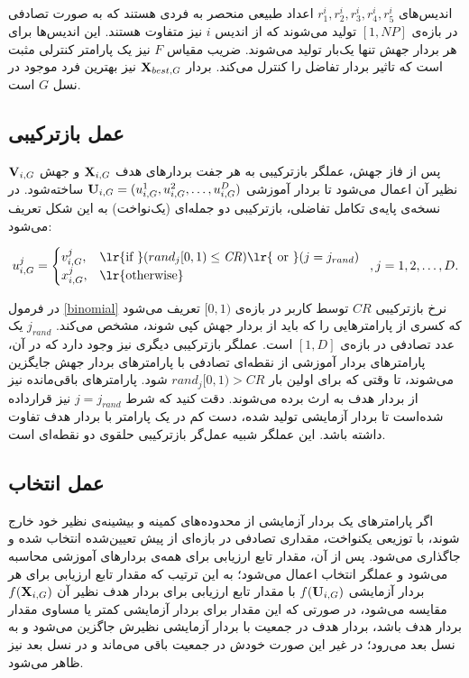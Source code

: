 \documentclass[12pt,a4paper]{article}
\theoremstyle{definition}
\theoremstyle{theorem}
\theoremstyle{definition}
\begin{document}
اندیس‌های 
\( r_{1}^i , r_{2}^i , r_{3}^i , r_{4}^i , r_{5}^i \)
 اعداد طبیعی منحصر به فردی هستند که به صورت تصادفی در بازه‌ی 
 \( [1,\mathit{NP}] \)
 تولید می‌شوند که از اندیس 
 $\mathit{i}$
 نیز متفاوت هستند. این اندیس‌ها برای هر بردار جهش تنها یک‌بار تولید می‌شوند. ضریب مقیاس 
 $\mathit{F}$
 نیز یک پارامتر کنترلی مثبت است که تاثیر بردار تفاضل را کنترل می‌کند. بردار 
 \( {\bf{X}}_{best, G} \)
 نیز بهترین فرد موجود در نسل
  \( G \) 
  است.   
  
\subsection{عمل بازترکیبی}

پس از فاز جهش، عملگر بازترکیبی به هر جفت بردار‌های هدف 
\( {\bf{X}}_{i,G} \)
و جهش 
\( {\bf{V}}_{i,G} \)
نظیر آن اعمال می‌شود تا بردار آموزشی 
\( {\bf{U}}_{i,G} = (u_{i,G}^1, u_{i,G}^2, \dots , u_{i,G}^D ) \)
ساخته‌شود. در نسخه‌ی پایه‌ی تکامل تفاضلی، بازترکیبی دو جمله‌ای (یک‌نواخت) به این شکل تعریف می‌شود:

\begin{equation}
\label{binomial}
u_{i,G}^j =
  \begin{cases}
   v_{i,G}^j , & \text{\lr{if }} (rand_j[0,1) \le \mathit{CR} ) \text{\lr{ or }} (j=j_{rand}) \\
   x_{i,G}^j , & \text{\lr{otherwise}}
  \end{cases}
  \hspace{0.2cm} , j = 1,2, \dots , D.
\end{equation}

در فرمول 
\ref{binomial}
نرخ بازترکیبی 
\( \mathit{CR} \) 
توسط کاربر در بازه‌ی 
$ [ 0 ,1 ) $ 
تعریف می‌شود که کسری از پارامترهایی را که باید از بردار جهش کپی شوند، مشخص می‌کند. 
$ j_{rand} $ 
یک عدد تصادفی در بازه‌ی 
$[ 1 , D ] $
است. عملگر بازترکیبی دیگری نیز وجود دارد که در آن، پارامترهای بردار آموزشی از نقطه‌ای تصادفی با پارامترهای بردار جهش جایگزین می‌شوند،‌ تا وقتی که برای اولین بار 
$rand_j [0,1) > \mathit{CR}$
شود. پارامترهای باقی‌مانده نیز از بردار هدف به ارث برده می‌شوند. دقت کنید که شرط 
$j=j_{rand}$ 
نیز قرارداده شده‌است تا بردار آزمایشی تولید شده، دست کم در یک پارامتر با بردار هدف تفاوت داشته باشد. این عملگر شبیه عمل‌گر بازترکیبی حلقوی دو نقطه‌ای است. 

\subsection{عمل انتخاب} 
اگر پارامتر‌های یک بردار آزمایشی از محدوده‌های کمینه و بیشینه‌ی نظیر خود خارج شوند،‌ با توزیعی یکنواخت، مقداری تصادفی در بازه‌ای از پیش‌ تعیین‌شده انتخاب شده و جاگذاری می‌شود. پس از آن، مقدار تابع ارزیابی برای همه‌ی بردارهای آموزشی محاسبه می‌شود و عملگر انتخاب اعمال می‌شود؛ به این ترتیب که مقدار تابع ارزیابی برای هر بردار آزمایشی 
$f({\bf{U}}_{i,G})$
با مقدار تابع ارزیابی برای بردار هدف نظیر آن 
$f({\bf{X}}_{i,G})$
مقایسه می‌شود، در صورتی که این مقدار برای بردار آزمایشی کمتر یا مساوی مقدار بردار هدف باشد، بردار هدف در جمعیت با بردار آزمایشی نظیرش جاگزین می‌شود و به نسل بعد می‌رود؛ در غیر این صورت خودش در جمعیت باقی‌ می‌ماند و در نسل بعد نیز ظاهر می‌شود. 
\end{document}
